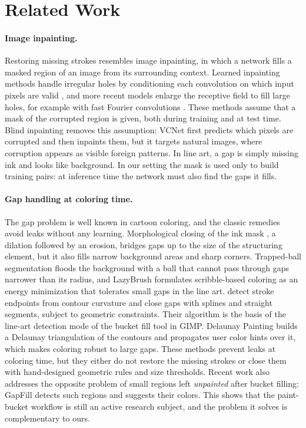 \documentclass[pdflatex,sn-mathphys-num]{sn-jnl}%
\begin{document}
\section{Related Work}
\label{sec:related}

\paragraph{Image inpainting.}
Restoring missing strokes resembles image inpainting, in which a network fills a
masked region of an image from its surrounding context. Learned inpainting methods
handle irregular holes by conditioning each convolution on which input pixels are
valid \citep{liu2018partialconv,yu2019gatedconv}, and more recent models enlarge
the receptive field to fill large holes, for example with fast Fourier convolutions
\citep{suvorov2022lama}. These methods assume that a mask of the corrupted region
is given, both during training and at test time. Blind inpainting removes this
assumption: VCNet \citep{wang2020vcnet} first predicts which pixels are corrupted
and then inpaints them, but it targets natural images, where corruption appears as
visible foreign patterns. In line art, a gap is simply missing ink and looks like
background. In our setting the mask is used only to build training pairs: at
inference time the network must also find the gaps it fills.

\paragraph{Gap handling at coloring time.}
The gap problem is well known in cartoon coloring, and the classic remedies avoid
leaks without any learning. Morphological closing of the ink mask
\citep{serra1982morphology,soille2003morphological}, a dilation followed by an
erosion, bridges gaps up to the size of the structuring element, but it also fills
narrow background areas and sharp corners. Trapped-ball segmentation
\citep{zhang2009vectorizing} floods the background with a ball that cannot pass
through gaps narrower than its radius, and LazyBrush \citep{sykora2009lazybrush}
formulates scribble-based coloring as an energy minimization that tolerates small
gaps in the line art. \citet{fourey2018flat} detect stroke endpoints from
contour curvature and close gaps with splines and straight segments, subject to
geometric constraints. Their algorithm is the basis of the line-art detection mode
of the bucket fill tool in GIMP. Delaunay Painting \citep{parakkat2022delaunay} builds a
Delaunay triangulation of the contours and propagates user color hints over it,
which makes coloring robust to large gaps. These methods prevent leaks at coloring
time, but they either do not restore the missing strokes or close them with
hand-designed geometric rules and size thresholds. Recent work also addresses the
opposite problem of small regions left \emph{unpainted} after bucket filling:
GapFill \citep{kono2026gapfill} detects such regions and suggests their colors. This
shows that the paint-bucket workflow is still an active research subject, and the
problem it solves is complementary to ours.
\end{document}
